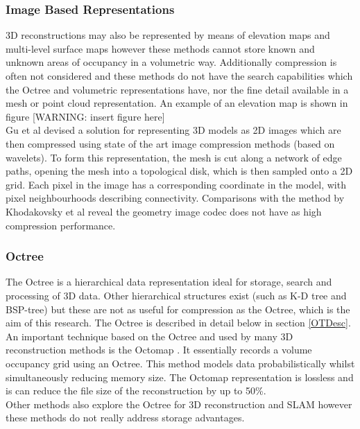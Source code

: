 \subsubsection{Image Based Representations}

3D reconstructions may also be represented by means of elevation maps \cite{Herbert89Terrain} and multi-level surface maps \cite{Triebel06Multi} however these methods cannot store known and unknown areas of occupancy in a volumetric way. Additionally compression is often not considered and these methods do not have the search capabilities which the Octree and volumetric representations have, nor the fine detail available in a mesh or point cloud representation. An example of an elevation map is shown in figure [WARNING: insert figure here]\\

Gu et al \cite{Gu02Geometry} devised a solution for representing 3D models as 2D images which are then compressed using state of the art image compression methods (based on wavelets). To form this representation, the mesh is cut along a network of edge paths, opening the mesh into a topological disk, which is then sampled onto a 2D grid. Each pixel in the image has a corresponding coordinate in the model, with pixel neighbourhoods describing connectivity. Comparisons with the method by Khodakovsky et al reveal the geometry image codec does not have as high compression performance. \\


\subsubsection{Octree}

The Octree is a hierarchical data representation ideal for storage, search and processing of 3D data. Other hierarchical structures exist (such as K-D tree and BSP-tree) \cite{Samet06Foundations} but these are not as useful for compression as the Octree, which is the aim of this research. The Octree is described in detail below in section \ref{OTDesc}. An important technique based on the Octree and used by many 3D reconstruction methods is the Octomap \cite{Wurm10Octomap}. It essentially records a volume occupancy grid using an Octree. This method models data probabilistically whilst simultaneously reducing memory size. The Octomap representation is lossless and is can reduce the file size of the reconstruction by up to 50\%. \\

Other methods also explore the Octree for 3D reconstruction and SLAM \cite{9,Fournier07Mapping,Meagher82Geometric,Fairfield07Real} however these methods do not really address storage advantages. 



